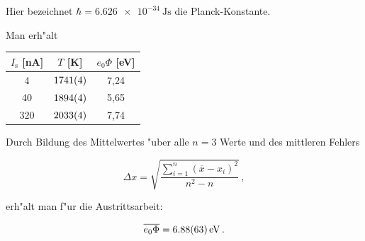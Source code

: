 		Hier bezeichnet $\hbar = \SI{6.626e-34}{\joule \second}$ \cite{nist} die Planck-Konstante.

		Man erh"alt

		\begin{table}[h!]
			\begin{center}
				\label{messung1}
				\begin{tabular}{|c|c|c|}
					\hline
						$I_\mathrm{s}$ [nA] & $T$ [K] & $e_0 \Phi$ [eV] \\
					\hline 
					\hline
						4 & $\SI{1741 (4)}{}$ & 7,24\\
						40 & $\SI{1894 (4)}{}$ & 5,65 \\
						320 & $\SI{2033 (4)}{}$ & 7,74 \\
					\hline 
				\end{tabular}
			\end{center}
		\end{table}

		\clearpage

		Durch Bildung des Mittelwertes "uber alle $n = 3$ Werte und des mittleren Fehlers

		\begin{equation*}
			\Delta x = \sqrt{\frac{\sum_{i=1}^{n}{\left(\overline{x} - x_i\right)^2}}{n^2 - n}}\,,
		\end{equation*}

		erh"alt man f"ur die Austrittsarbeit:

		\begin{eqnarray*}
			\overline{e_0 \Phi} = \SI{6.88 (63)}{\electronvolt}\,.
		\end{eqnarray*}

